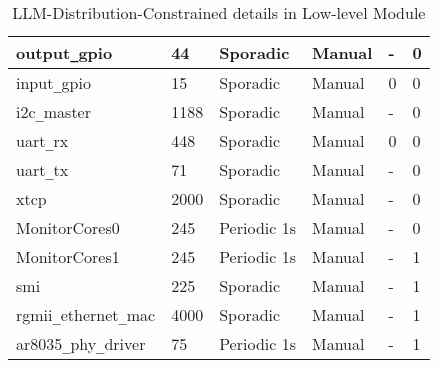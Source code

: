 {\begin{table}[!ht]
{\begin{tabular}{|l|l|l|l|l|l|}
		\hline
		output\texttt{\_}gpio &
		44 & 
		Sporadic & 
		Manual &
		- &
		0\\
		\hline
		input\texttt{\_}gpio &
		15 & 
		Sporadic & 
		Manual &
		0 &
		0\\
		\hline
		i2c\texttt{\_}master &
		1188 & 
		Sporadic & 
		Manual &
		- &
		0\\
		\hline
		uart\texttt{\_}rx &
		448 & 
		Sporadic & 
		Manual &
		0 &
		0\\
		\hline
		uart\texttt{\_}tx &
		71 & 
		Sporadic & 
		Manual &
		- &
		0\\
		\hline
		xtcp &
		2000 & 
		Sporadic & 
		Manual &
		- &
		0\\
		\hline
		MonitorCores0 &
		245 & 
		Periodic 1s & 
		Manual &
		- &
		0\\
		\hline
		MonitorCores1 &
		245 & 
		Periodic 1s & 
		Manual &
		- &
		1\\
		\hline
		smi &
		225 & 
		Sporadic & 
		Manual &
		- &
		1\\
		\hline
		rgmii\texttt{\_}ethernet\texttt{\_}mac &
		4000 & 
		Sporadic & 
		Manual &
		- &
		1\\
		\hline
		ar8035\texttt{\_}phy\texttt{\_}driver &
		75 & 
		Periodic 1s & 
		Manual &
		- &
		1\\
		\hline
	\end{tabular}}
	\caption{LLM-Distribution-Constrained details in Low-level Module}
	\label{tbl_LLM_Distribution_Constrained}
\end{table}
}


